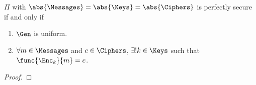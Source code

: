 \begin{theorem}
    \(\Pi\) with \(\abs{\Messages} = \abs{\Keys} = \abs{\Ciphers}\) is perfectly secure if and only if 
    \begin{enumerate}
        \item \(\Gen\) is uniform.
        \item \(\forall m \in \Messages\) and \(c \in \Ciphers\), \(\exists! k \in \Keys\) such that \(\func{\Enc_k}{m} = c\).
    \end{enumerate}
\end{theorem}

\begin{proof}
    
\end{proof}